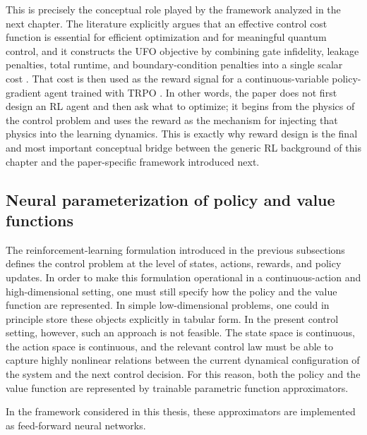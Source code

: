 This is precisely the conceptual role played by the framework analyzed in the next chapter. The literature explicitly argues that an effective control cost function is essential for efficient optimization and for meaningful quantum control, and it constructs the UFO objective by combining gate infidelity, leakage penalties, total runtime, and boundary-condition penalties into a single scalar cost \cite{Niu2019}. That cost is then used as the reward signal for a continuous-variable policy-gradient agent trained with TRPO \cite{Niu2019}. In other words, the paper does not first design an RL agent and then ask what to optimize; it begins from the physics of the control problem and uses the reward as the mechanism for injecting that physics into the learning dynamics. This is exactly why reward design is the final and most important conceptual bridge between the generic RL background of this chapter and the paper-specific framework introduced next.




\subsection{Neural parameterization of policy and value functions}
\label{subsec:neural_parameterization_policy_value}

The reinforcement-learning formulation introduced in the previous subsections defines the control problem at the level of states, actions, rewards, and policy updates. In order to make this formulation operational in a continuous-action and high-dimensional setting, one must still specify how the policy and the value function are represented. In simple low-dimensional problems, one could in principle store these objects explicitly in tabular form. In the present control setting, however, such an approach is not feasible. The state space is continuous, the action space is continuous, and the relevant control law must be able to capture highly nonlinear relations between the current dynamical configuration of the system and the next control decision. For this reason, both the policy and the value function are represented by trainable parametric function approximators.

In the framework considered in this thesis, these approximators are implemented as feed-forward neural networks. 

